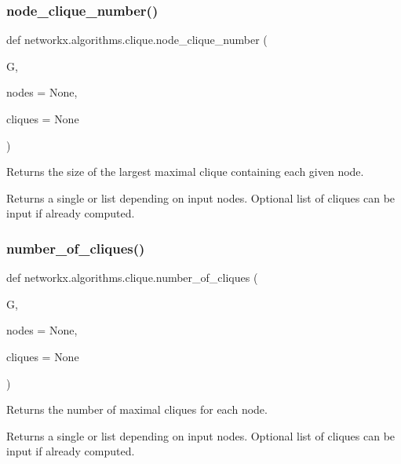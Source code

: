 \subsubsection{\texorpdfstring{node\+\_\+clique\+\_\+number()}{node\_clique\_number()}}
{\footnotesize\ttfamily def networkx.\+algorithms.\+clique.\+node\+\_\+clique\+\_\+number (\begin{DoxyParamCaption}\item[{}]{G,  }\item[{}]{nodes = {\ttfamily None},  }\item[{}]{cliques = {\ttfamily None} }\end{DoxyParamCaption})}

\begin{DoxyVerb}Returns the size of the largest maximal clique containing
each given node.

Returns a single or list depending on input nodes.
Optional list of cliques can be input if already computed.
\end{DoxyVerb}
 \mbox{\label{namespacenetworkx_1_1algorithms_1_1clique_a715dddf1461fea94accb43717f4e7fb6}} 
\subsubsection{\texorpdfstring{number\+\_\+of\+\_\+cliques()}{number\_of\_cliques()}}
{\footnotesize\ttfamily def networkx.\+algorithms.\+clique.\+number\+\_\+of\+\_\+cliques (\begin{DoxyParamCaption}\item[{}]{G,  }\item[{}]{nodes = {\ttfamily None},  }\item[{}]{cliques = {\ttfamily None} }\end{DoxyParamCaption})}

\begin{DoxyVerb}Returns the number of maximal cliques for each node.

Returns a single or list depending on input nodes.
Optional list of cliques can be input if already computed.
\end{DoxyVerb}
 